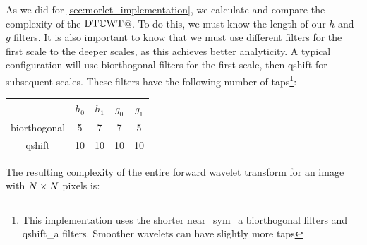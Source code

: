   As we did for \autoref{sec:morlet_implementation}, we calculate and compare
  the complexity of the $\mathrm{DT}\mathbb{C}\mathrm{WT}$@. To do this, we must know the length of our
  $h$ and $g$ filters. It is also important to know that we must use different
  filters for the first scale to the deeper scales, as this achieves better
  analyticity. A typical configuration will use biorthogonal filters for the
  first scale, then qshift for subsequent scales.
  These filters have the following number of taps\footnote{This implementation
  uses the shorter near\_sym\_a biorthogonal filters and qshift\_a filters.
  Smoother wavelets can have slightly more taps}:
    \begin{center}
    \begin{tabular}{ccccc} \hline
                   & $h_0$ & $h_1$ & $g_0$ & $g_1$ \\\hline
      biorthogonal & 5     & 7     & 7     & 5     \\
      qshift       & 10    & 10    & 10    & 10      
    \end{tabular}
    \end{center}
  The resulting complexity of the entire forward wavelet transform for an image
  with $N\times N$ pixels is:
